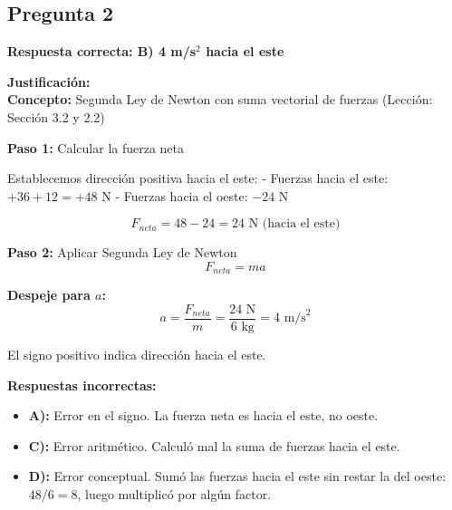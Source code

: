 \begin{respuestabox}
\subsection{Pregunta 2}
\textcolor{verdecorrecto}{\textbf{Respuesta correcta: B) 4 m/s$^2$ hacia el este}}

\textbf{Justificación:}\\
\textbf{Concepto:} Segunda Ley de Newton con suma vectorial de fuerzas (Lección: Sección 3.2 y 2.2)

\textbf{Paso 1:} Calcular la fuerza neta

Establecemos dirección positiva hacia el este:
- Fuerzas hacia el este: $+36 + 12 = +48$ N
- Fuerzas hacia el oeste: $-24$ N

$$F_{neta} = 48 - 24 = 24 \text{ N (hacia el este)}$$

\textbf{Paso 2:} Aplicar Segunda Ley de Newton
$$F_{neta} = ma$$

\textbf{Despeje para $a$:}
$$a = \frac{F_{neta}}{m} = \frac{24 \text{ N}}{6 \text{ kg}} = 4 \text{ m/s}^2$$

El signo positivo indica dirección hacia el este.

\textbf{Respuestas incorrectas:}
\begin{itemize}
    \item \textbf{A):} Error en el signo. La fuerza neta es hacia el este, no oeste.
    \item \textbf{C):} Error aritmético. Calculó mal la suma de fuerzas hacia el este.
    \item \textbf{D):} Error conceptual. Sumó las fuerzas hacia el este sin restar la del oeste: $48/6 = 8$, luego multiplicó por algún factor.
\end{itemize}
\end{respuestabox}

